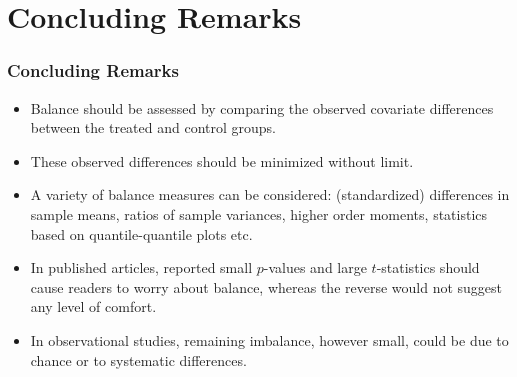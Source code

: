 \documentclass[trans]{beamer}
\begin{document}
\section{Concluding Remarks}
\begin{frame}
  \frametitle{Concluding Remarks}

\begin{itemize}
\item Balance should be assessed by comparing the observed covariate
  differences between the treated and control groups.

\item These observed differences should be minimized without limit. 
  
\item A variety of balance measures can be considered: (standardized)
  differences in sample means, ratios of sample variances, higher
  order moments, statistics based on quantile-quantile plots etc.
  
\item In published articles, reported small $p$-values and large
  $t$-statistics should cause readers to worry about balance, whereas
  the reverse would not suggest any level of comfort.
  
\item In observational studies, remaining imbalance, however small,
  could be due to chance or to systematic differences.
\end{itemize}

\end{frame}
\end{document}
